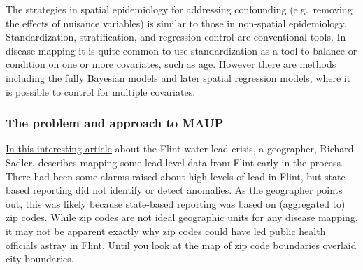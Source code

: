 \documentclass[
]{book}
\begin{document}
The strategies in spatial epidemiology for addressing confounding (e.g.~removing the effects of nuisance variables) is similar to those in non-spatial epidemiology. Standardization, stratification, and regression control are conventional tools. In disease mapping it is quite common to use standardization as a tool to balance or condition on one or more covariates, such as age. However there are methods including the fully Bayesian models and later spatial regression models, where it is possible to control for multiple covariates.

\hypertarget{the-problem-and-approach-to-maup}{%
\subsubsection{The problem and approach to MAUP}\label{the-problem-and-approach-to-maup}}

\href{https://theconversation.com/how-zip-codes-nearly-masked-the-lead-problem-in-flint-65626}{In this interesting article} about the Flint water lead crisis, a geographer, Richard Sadler, describes mapping some lead-level data from Flint early in the process. There had been some alarms raised about high levels of lead in Flint, but state-based reporting did not identify or detect anomalies. As the geographer points out, this was likely because state-based reporting was based on (aggregated to) zip codes. While zip codes are not ideal geographic units for any disease mapping, it may not be apparent exactly why zip codes could have led public health officials astray in Flint. Until you look at the map of zip code boundaries overlaid city boundaries.
\end{document}

